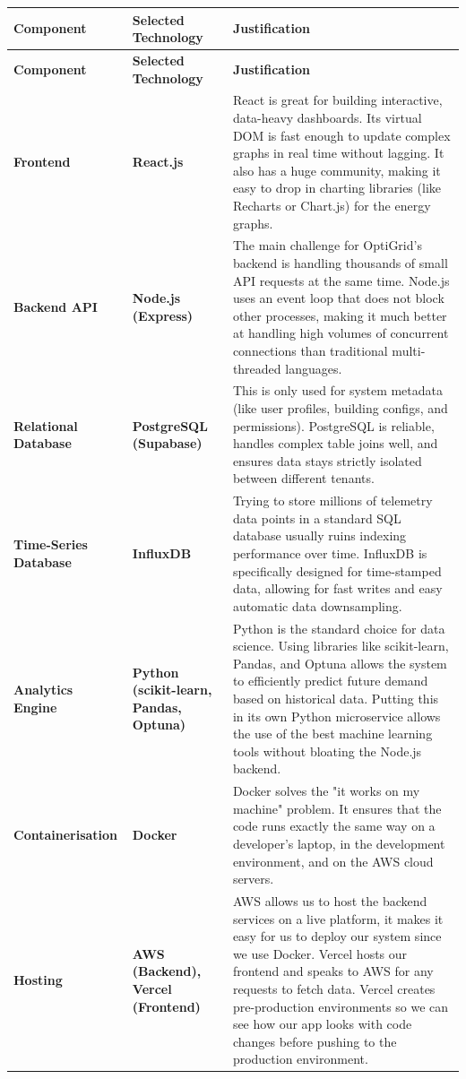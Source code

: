 \documentclass[12pt, a4paper]{article}
\begin{document}
\sloppy
\renewcommand{\arraystretch}{1.5}
\begin{longtable}{|>{\bfseries}p{}|>{\bfseries}p{}|p{}|}
\hline
\textbf{Component} & \textbf{Selected Technology} & \textbf{Justification} \\ \hline
\endfirsthead
\hline
\textbf{Component} & \textbf{Selected Technology} & \textbf{Justification} \\ \hline
\endhead
Frontend &
React.js &
React is great for building interactive, data-heavy dashboards. Its virtual DOM is fast enough to update complex graphs in real time without lagging. It also has a huge community, making it easy to drop in charting libraries (like Recharts or Chart.js) for the energy graphs. \\ \hline
Backend API &
Node.js    (Express) &
The main challenge for OptiGrid's backend is handling thousands of small API requests at the same time. Node.js uses an event loop that does not block other processes, making it much better at handling high volumes of concurrent connections than traditional multi-threaded languages. \\ \hline
Relational Database &
PostgreSQL  (Supabase) &
This is only used for system metadata (like user profiles, building configs, and permissions). PostgreSQL is reliable, handles complex table joins well, and ensures data stays strictly isolated between different tenants. \\ \hline
Time-Series Database &
InfluxDB &
Trying to store millions of telemetry data points in a standard SQL database usually ruins indexing performance over time. InfluxDB is specifically designed for time-stamped data, allowing for fast writes and easy automatic data downsampling. \\ \hline
Analytics Engine &
Python (scikit-learn, Pandas, Optuna) &
Python is the standard choice for data science. Using libraries like scikit-learn, Pandas, and Optuna allows the system to efficiently predict future demand based on historical data. Putting this in its own Python microservice allows the use of the best machine learning tools without bloating the Node.js backend. \\ \hline
Containerisation &
Docker &
Docker solves the "it works on my machine" problem. It ensures that the code runs exactly the same way on a developer's laptop, in the development environment, and on the AWS cloud servers. \\ \hline
Hosting &
AWS (Backend), Vercel (Frontend) &
AWS allows us to host the backend services on a live platform, it makes it easy for us to deploy our system since we use Docker. Vercel hosts our frontend and speaks to AWS for any requests to fetch data. Vercel creates pre-production environments so we can see how our app looks with code changes before pushing to the production environment. \\ \hline
\end{longtable}
\newpage
\end{document}
